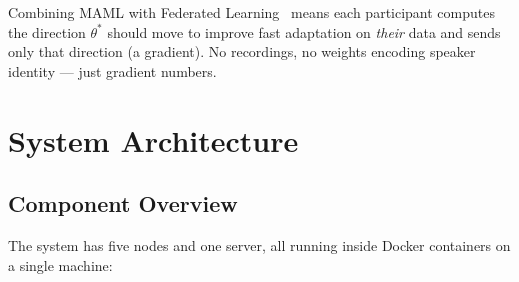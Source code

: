 \documentclass[11pt,a4paper]{article}
\theoremstyle{definition}
\begin{document}
Combining MAML with Federated Learning~\cite{mcmahan2017fedavg} means each
participant computes the direction $\theta^*$ should move to improve fast
adaptation on \emph{their} data and sends only that direction (a gradient).  No
recordings, no weights encoding speaker identity --- just gradient numbers.

\section{System Architecture}

\label{sec:architecture}

\subsection{Component Overview}

The system has five nodes and one server, all running inside Docker containers on
a single machine:
\end{document}
